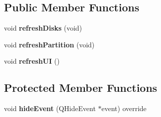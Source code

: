 \subsection*{Public Member Functions}
\begin{DoxyCompactItemize}
\item 
\mbox{\label{classui_1_1window_1_1_main_window_a770edeeb1dca0d8365f28ded5ac8c1a7}} 
void {\bfseries refresh\+Disks} (void)
\item 
\mbox{\label{classui_1_1window_1_1_main_window_a1e20191c2f6cecf881ed3a4de6147e12}} 
void {\bfseries refresh\+Partition} (void)
\item 
\mbox{\label{classui_1_1window_1_1_main_window_a8f650e410a52c007fbc62e13b09cceef}} 
void {\bfseries refresh\+UI} ()
\end{DoxyCompactItemize}
\subsection*{Protected Member Functions}
\begin{DoxyCompactItemize}
\item 
\mbox{\label{classui_1_1window_1_1_main_window_a5721fc9aa7fcc5727e137c8f4264db24}} 
void {\bfseries hide\+Event} (Q\+Hide\+Event $\ast$event) override
\end{DoxyCompactItemize}
